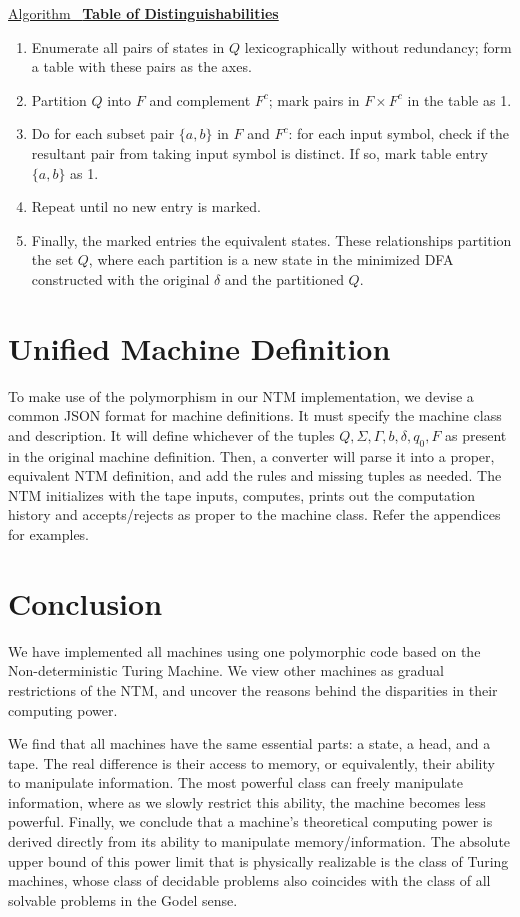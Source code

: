 \documentclass[12pt]{article}  %
\newcommand{\algtitle}[1]{\underline{Algorithm \ {\bf #1}} \vspace*{1mm}\\}
\begin{document}
\algtitle{Table of Distinguishabilities}
\begin{enumerate}
	\item Enumerate all pairs of states in $Q$ lexicographically without redundancy; form a table with these pairs as the axes.
	\item Partition $Q$ into $F$ and complement $F^c$; mark pairs in $F \times F^c$ in the table as 1.
	\item Do for each subset pair $\{a,b\}$ in $F$ and $F^c$:
	for each input symbol, check if the resultant pair from taking input symbol is distinct. If so, mark table entry $\{a,b\}$ as 1.
	\item Repeat until no new entry is marked.
	\item Finally, the marked entries the equivalent states. These relationships partition the set $Q$, where each partition is a new state in the minimized DFA constructed with the original $\delta$ and the partitioned $Q$.
\end{enumerate}





\section{Unified Machine Definition}
To make use of the polymorphism in our NTM implementation, we devise a common JSON format for machine definitions. It must specify the machine class and description. It will define whichever of the tuples $Q, \Sigma, \Gamma, b, \delta, q_0, F$ as present in the original machine definition. Then, a converter will parse it into a proper, equivalent NTM definition, and add the rules and missing tuples as needed. The NTM initializes with the tape inputs, computes, prints out the computation history and accepts/rejects as proper to the machine class. Refer the appendices for examples.



\section{Conclusion}
We have implemented all machines using one polymorphic code based on the Non-deterministic Turing Machine. We view other machines as gradual restrictions of the NTM, and uncover the reasons behind the disparities in their computing power. 

We find that all machines have the same essential parts: a state, a head, and a tape. The real difference is their access to memory, or equivalently, their ability to manipulate information. The most powerful class can freely manipulate information, where as we slowly restrict this ability, the machine becomes less powerful. Finally, we conclude that a machine's theoretical computing power is derived directly from its ability to manipulate memory/information. The absolute upper bound of this power limit that is physically realizable is the class of Turing machines, whose class of decidable problems also coincides with the class of all solvable problems in the Godel sense.
\end{document}
